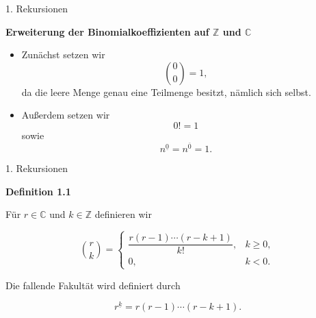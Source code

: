 \documentclass{beamer}
\begin{document}
\begin{frame}{1. Rekursionen}

\textbf{Erweiterung der Binomialkoeffizienten auf \(\mathbb{Z}\) und \(\mathbb{C}\) }

\begin{itemize}
    
    \item Zunächst setzen wir
    \[
    \binom{0}{0}=1,
    \]
    da die leere Menge genau eine Teilmenge besitzt, nämlich sich selbst.

    \item Außerdem setzen wir
    \[
    0! = 1
    \]
    sowie
    \[
    n^{\underline{0}} = n^{\overline{0}} = 1.
    \]

\end{itemize}

\vspace{0.2cm}

\end{frame}

\begin{frame}{1. Rekursionen}

\textbf{Definition 1.1}

\vspace{0.2cm}

Für \(r\in\mathbb{C}\) und \(k\in\mathbb{Z}\) definieren wir

\[
\binom{r}{k}
=
\begin{cases}
\dfrac{r(r-1)\cdots(r-k+1)}{k!}, & k\geq 0,\\[1ex]
0, & k<0.
\end{cases}
\]

\vspace{0.4cm}

Die fallende Fakultät wird definiert durch

\[
r^{\underline{k}}
=
r(r-1)\cdots(r-k+1).
\]

\end{frame}
\end{document}
